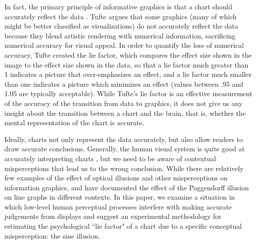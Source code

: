 \documentclass[11pt]{isuthesis}\usepackage[]{graphicx}\usepackage[]{color}
\begin{document}
In fact, the primary principle of informative graphics is that a chart should accurately reflect the data \citep{tufte}. Tufte argues that some graphics (many of which might be better classified as visualizations) do not accurately reflect the data because they blend artistic rendering with numerical information, sacrificing numerical accuracy for visual appeal. In order to quantify the loss of numerical accuracy, Tufte created the lie factor, which compares the effect size shown in the image to the effect size shown in the data, so that a lie factor much greater than 1 indicates a picture that over-emphasizes an effect, and a lie factor much smaller than one indicates a picture which minimizes an effect (values between .95 and 1.05 are typically acceptable). While Tufte's lie factor is an effective measurement of the accuracy of the transition from data to graphics, it does not give us any insight about the transition between a chart and the brain, that is, whether the mental representation of the chart is accurate.

Ideally, charts not only represent the data accurately, but  also allow readers to draw accurate conclusions. Generally, the human visual system is quite good at accurately interpreting charts \citep{cleveland:1984,kosara2010}, but we need to be aware of contextual misperceptions that lead us to the wrong conclusion. While there are relatively few examples of the effect of optical illusions and other misperceptions on information graphics, \citet{amer2005bias} and \citet{poulton1985geometric} have documented the effect of the Poggendorff illusion on line graphs in different contexts. In this paper, we examine a situation in which low-level human perceptual processes interfere with making accurate judgements from displays and suggest an experimental methodology for estimating the psychological ``lie factor" of a chart due to a specific conceptual misperception: the sine illusion. 
\end{document}
